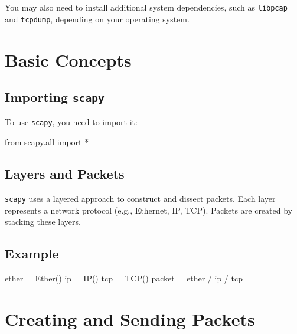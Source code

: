 \documentclass[
  letterpaper,
  DIV=11,
  numbers=noendperiod]{scrreprt}
\newenvironment{Shaded}{\begin{snugshade}}{\end{snugshade}}
\newcommand{\BuiltInTok}[1]{\textcolor[rgb]{0.00,0.23,0.31}{#1}}
\newcommand{\ImportTok}[1]{\textcolor[rgb]{0.00,0.46,0.62}{#1}}
\newcommand{\NormalTok}[1]{\textcolor[rgb]{0.00,0.23,0.31}{#1}}
\newcommand{\OperatorTok}[1]{\textcolor[rgb]{0.37,0.37,0.37}{#1}}
\begin{document}
You may also need to install additional system dependencies, such as
\texttt{libpcap} and \texttt{tcpdump}, depending on your operating
system.

\section{Basic Concepts}\label{basic-concepts-2}

\subsection{\texorpdfstring{Importing
\texttt{scapy}}{Importing scapy}}\label{importing-scapy}

To use \texttt{scapy}, you need to import it:

\begin{Shaded}
\begin{Highlighting}[]
\ImportTok{from}\NormalTok{ scapy.}\BuiltInTok{all} \ImportTok{import} \OperatorTok{*}
\end{Highlighting}
\end{Shaded}

\subsection{Layers and Packets}\label{layers-and-packets}

\texttt{scapy} uses a layered approach to construct and dissect packets.
Each layer represents a network protocol (e.g., Ethernet, IP, TCP).
Packets are created by stacking these layers.

\subsection{Example}\label{example-17}

\begin{Shaded}
\begin{Highlighting}[]
\NormalTok{ether }\OperatorTok{=}\NormalTok{ Ether()}
\NormalTok{ip }\OperatorTok{=}\NormalTok{ IP()}
\NormalTok{tcp }\OperatorTok{=}\NormalTok{ TCP()}
\NormalTok{packet }\OperatorTok{=}\NormalTok{ ether }\OperatorTok{/}\NormalTok{ ip }\OperatorTok{/}\NormalTok{ tcp}
\end{Highlighting}
\end{Shaded}

\section{Creating and Sending
Packets}\label{creating-and-sending-packets}
\end{document}
